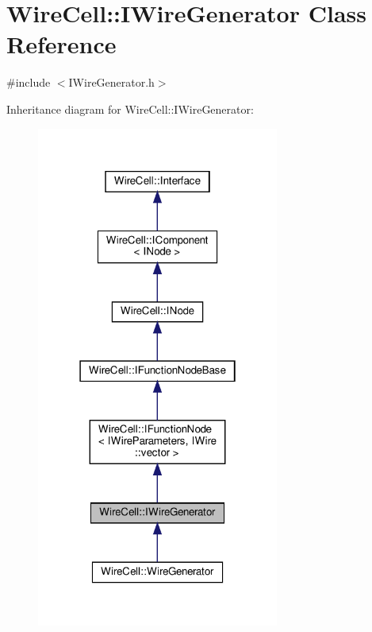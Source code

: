 \hypertarget{class_wire_cell_1_1_i_wire_generator}{}\section{Wire\+Cell\+:\+:I\+Wire\+Generator Class Reference}
\label{class_wire_cell_1_1_i_wire_generator}


{\ttfamily \#include $<$I\+Wire\+Generator.\+h$>$}



Inheritance diagram for Wire\+Cell\+:\+:I\+Wire\+Generator\+:
\nopagebreak
\begin{figure}[H]
\begin{center}
\leavevmode
\includegraphics[width=226pt]{class_wire_cell_1_1_i_wire_generator__inherit__graph}
\end{center}
\end{figure}


